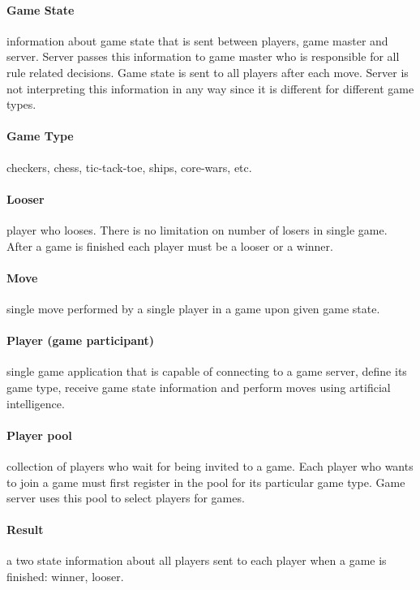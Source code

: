 \documentclass{article}
\begin{document}
\paragraph{Game State} information about game state that is sent between players, 
game master and server. Server passes this information to game master who is responsible 
for all rule related decisions. Game state is sent to all players after each move. 
Server is not interpreting this information in any way since it is different 
for different game types.

\paragraph{Game Type} checkers, chess, tic-tack-toe, ships, core-wars, etc.

\paragraph{Looser} player who looses. There is no limitation on number of losers in single game. 
After a game is finished each player must be a looser or a winner.

\paragraph{Move} single move performed by a single player in a game upon given game state.

\paragraph{Player (game participant)} single game application that is capable of connecting 
to a game server, define its game type, receive game state information and perform moves 
using artificial intelligence.

\paragraph{Player pool} collection of players who wait for being invited to a game. 
Each player who wants to join a game must first register in the pool for its particular 
game type. Game server uses this pool to select players for games.

\paragraph{Result} a two state information about all players sent to each player when 
a game is finished: winner, looser. 
\end{document}
